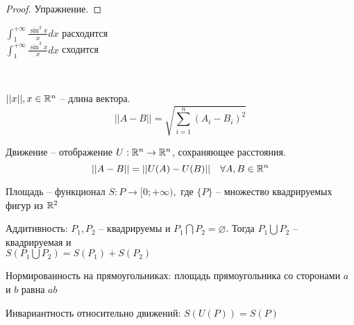 \begin{proof}
	Упражнение.
\end{proof}

\begin{Cons}
	$\displaystyle \int_{1}^{+\infty} \frac{\sin^2 x}{x} dx$ расходится\\
	$\displaystyle \int_{1}^{+\infty} \frac{\sin^3 x}{x} dx$ сходится
\end{Cons}

\\
\begin{Def} 
	$||x||, x \in \mathbb{R}^n$ -- длина вектора. \\
	$$\displaystyle ||A-B|| = \sqrt{\sum_{i=1}^{n} (A_i - B_i)^2}$$
\end{Def} 

\begin{Def} 
	Движение -- отображение $U: \mathbb{R}^n \to \mathbb{R}^n$, сохраняющее расстояния.\\
	$$||A-B|| = ||U(A) - U(B)|| \ \ \ \forall A, B \in \mathbb{R}^n$$
\end{Def} 

\begin{Def} 
	Площадь -- функционал $S: {P} \to [0; +\infty),$ где $\{P\}$ -- множество квадрируемых фигур из $\mathbb{R}^2$
\end{Def} 

\begin{Thm}
	\begin{MyList}
		\item Аддитивность: $P_1, P_2$ -- квадрируемы и $P_1 \bigcap P_2 = \varnothing$. Тогда
		$P_1 \bigcup P_2$ -- квадрируемая и \\$S(P_1 \bigcup P_2) = S(P_1) + S(P_2)$
		\item Нормированность на прямоугольниках: площадь прямоугольника со сторонами $a$ и $b$ равна $ab$
		\item Инвариантность относительно движений: $S(U(P)) = S(P)$
	\end{MyList}
\end{Thm}


